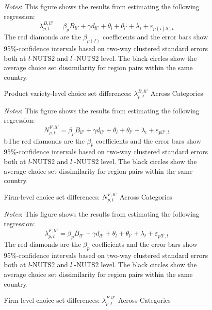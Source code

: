  \begin{figure}[H]
    \centering
    \caption{Product variety-level choice set differences: $\lambda^{B,ll'}_{p,t}$ Across 
    Categories}
    \label{fig: app_redform_choice_bar_cats_e}
    
     \parbox{\textwidth}{
        \begin{spacing}{1} 
            {\footnotesize 
            \textit{Notes}: This figure shows the results from estimating the following 
            regression:$$\lambda^{B,ll'}_{p,t} = \beta_{p} B_{ll'} + \gamma d_{ll'} + \theta_l + \theta_{l'} + \lambda_{t} + \varepsilon_{p(i)ll',t}$$ The red diamonds are the $\beta_{p(f)}$ coefficients and the error bars show 95\%-confidence intervals based on two-way clustered standard errors both at $l$-NUTS2 and $l^{'}$-NUTS2 level. The black circles show the average choice set dissimilarity for region pairs within the same country.}
        \end{spacing}}
 \end{figure} 

 \begin{figure}[H]
    \centering
    \caption{Firm-level choice set differences: $N^{F,ll'}_{p,t}$ Across Categories}
    \label{fig: app_redform_choice_firm_cats_n}
    
     \parbox{\textwidth}{
        \begin{spacing}{1} 
            {\footnotesize 
            \textit{Notes}: This figure shows the results from estimating the following regression: $$N^{F,ll'}_{p,t} = \beta_{p} B_{ll'} + \gamma d_{ll'} + \theta_l + \theta_{l'} + \lambda_{t} + \varepsilon_{pll',t}$$bThe red diamonds are the $\beta_{p}$ coefficients and the error bars show 95\%-confidence intervals based on two-way clustered standard errors both at $l$-NUTS2 and $l^{'}$-NUTS2 level. The black circles show the average choice set dissimilarity for region pairs within the same country.}
        \end{spacing}}
 \end{figure} 

 \begin{figure}[H]
    \centering
    \caption{Firm-level choice set differences: $\lambda^{F,ll'}_{p,t}$ Across Categories}
    \label{fig: app_redform_choice_firm_cats_e}
    
     \parbox{\textwidth}{
        \begin{spacing}{1} 
            {\footnotesize 
            \textit{Notes}: This figure shows the results from estimating the following regression:
            $$\lambda^{F,ll'}_{p,t} = \beta_{p} B_{ll'} + \gamma d_{ll'} + \theta_l + \theta_{l'} + \lambda_{t} + \varepsilon_{pll',t}$$ The red diamonds are the $\beta_{p}$ coefficients and the error bars show 95\%-confidence intervals based on two-way clustered standard errors both at $l$-NUTS2 and $l^{'}$-NUTS2 level. The black circles show the average choice set dissimilarity for region pairs within the same country.}
        \end{spacing}}
 \end{figure} 